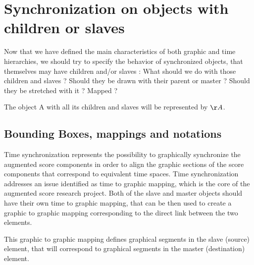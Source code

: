 \documentclass[a4paper]{article}
\begin{document}
\section{Synchronization on objects with children or slaves}\label{sec:sync_children}

Now that we have defined the main characteristics of both graphic and time hierarchies, we should try to specify the behavior of synchronized objects, that themselves may have children and/or slaves : What should we do with those children and slaves ? Should they be drawn with their parent or master ? Should they be stretched with it ? Mapped ?

The object A with all its children and slaves will be represented by $\r A$.

%
%  
%
%
%
%
%

\subsection{Bounding Boxes, mappings and notations}\label{subsec:bb}

Time synchronization represents the possibility to graphically synchronize the augmented score components in order to align the graphic sections of the score components that correspond to equivalent time spaces. Time synchronization addresses an issue identified as time to graphic mapping, which is the core of the augmented score research project. Both of the slave and master objects should have their own time to graphic mapping, that can be then used to create a graphic to graphic mapping corresponding to the direct link between the two elements. 

This graphic to graphic mapping defines graphical segments in the slave (source) element, that will correspond to graphical segments in the master (destination) element.
\end{document}
